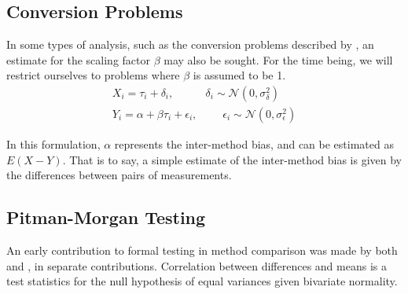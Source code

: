\documentclass[12pt, a4paper]{report}
\theoremstyle{plain}
\theoremstyle{definition}
\theoremstyle{remark}
\begin{document}






\subsection{Conversion Problems}
%	
In some types of analysis, such as the conversion problems described by \citet{lewis}, an estimate for 
the scaling factor $\beta$ may also be sought. For the time being, we will restrict ourselves to problems where $\beta$ is assumed to be 1. 
\begin{eqnarray}
X_i = \tau_i + \delta_i, \phantom{spacin} \delta_i \sim \mathcal{N}(0,\sigma^2_\delta)\\
Y_i = \alpha + \beta \tau_i + \epsilon_i, \phantom{spaci}  \epsilon_i \sim \mathcal{N}(0,\sigma^2_\epsilon)
\end{eqnarray}

In this formulation, $\alpha$ represents the inter-method bias, and can be estimated as $E(X-Y)$. That is to say, a simple estimate of the inter-method bias is given by the differences between pairs of measurements.  









\subsection{Pitman-Morgan Testing}
An early contribution to formal testing in method comparison was
made by both \citet{morgan} and \citet{pitman}, in separate
contributions. Correlation between differences and means is a test statistics for the null hypothesis of equal variances given bivariate normality. 
\end{document}

